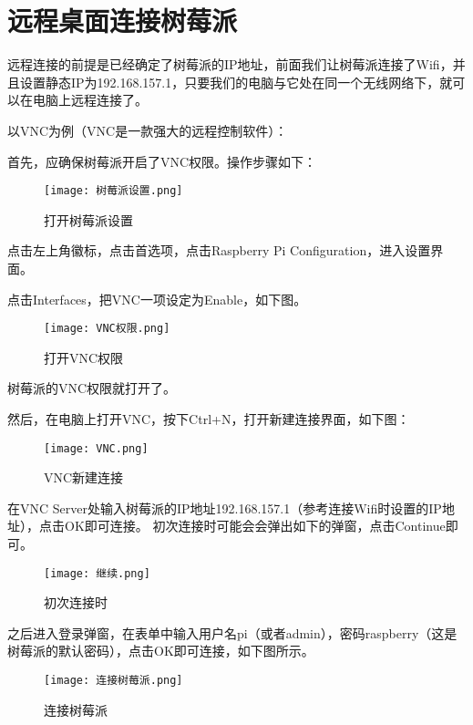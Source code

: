 \section{远程桌面连接树莓派}
远程连接的前提是已经确定了树莓派的IP地址，前面我们让树莓派连接了Wifi，并且设置静态IP为192.168.157.1，只要我们的电脑与它处在同一个无线网络下，就可以在电脑上远程连接了。
\par
以VNC为例（VNC是一款强大的远程控制软件）：
\par 
首先，应确保树莓派开启了VNC权限。操作步骤如下：
\begin{figure}[H]
	\centering
	\texttt{[image: 树莓派设置.png]}
	\caption{打开树莓派设置}
	\label{fig:example}
\end{figure}
点击左上角徽标，点击首选项，点击Raspberry Pi Configuration，进入设置界面。
\par 
点击Interfaces，把VNC一项设定为Enable，如下图。
\begin{figure}[H]
	\centering
	\texttt{[image: VNC权限.png]}
	\caption{打开VNC权限}
	\label{fig:example}
\end{figure}
树莓派的VNC权限就打开了。
\par 
然后，在电脑上打开VNC，按下Ctrl+N，打开新建连接界面，如下图：
\begin{figure}[H]
	\centering
	\texttt{[image: VNC.png]}
	\caption{VNC新建连接}
	\label{fig:example}
\end{figure}
在VNC Server处输入树莓派的IP地址192.168.157.1（参考连接Wifi时设置的IP地址），点击OK即可连接。
初次连接时可能会会弹出如下的弹窗，点击Continue即可。
\begin{figure}[H]
	\centering
	\texttt{[image: 继续.png]}
	\caption{初次连接时}
	\label{fig:example}
\end{figure}
\par 
之后进入登录弹窗，在表单中输入用户名pi（或者admin），密码raspberry（这是树莓派的默认密码），点击OK即可连接，如下图所示。
\begin{figure}[H]
	\centering
	\texttt{[image: 连接树莓派.png]}
	\caption{连接树莓派}
	\label{fig:example}
\end{figure}

